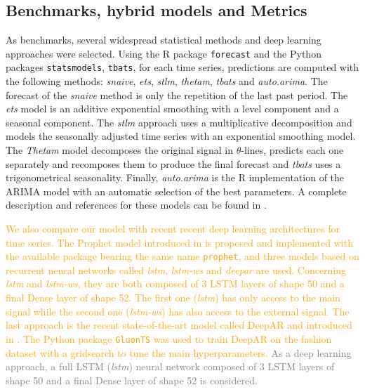 \documentclass[10pt]{article} %
\begin{document}
\subsection{Benchmarks, hybrid models and Metrics}
\label{sec:fashiontraining}

As benchmarks, several widespread statistical methods and deep learning approaches were selected. Using the R package \texttt{forecast} and the Python packages \texttt{statsmodels},  \texttt{tbats}, for each time series, predictions are computed with the following methods: \textit{snaive}, \textit{ets}, \textit{stlm}, \textit{thetam}, \textit{tbats} and \textit{auto.arima}. The forecast of the \textit{snaive} method is only the repetition of the last past period. The \textit{ets} model is an additive exponential smoothing with a level component and a seasonal component. The \textit{stlm} approach uses a multiplicative decomposition and models the seasonally adjusted time series with an exponential smoothing model. The \textit{Thetam} model decomposes the original signal in $\theta$-lines, predicts each one separately and recomposes them to produce the final forecast and \textit{tbats} uses a trigonometrical seasonality. Finally, \textit{auto.arima} is the R implementation of the ARIMA model with an automatic selection of the best parameters. A complete description and references for these models can be found in \citet{hyndman2020}. 

\textcolor{orange}{We also compare our model with recent recent deep learning architectures for time series. The Prophet model introduced in \citet{Taylor2017} is proposed and implemented with the available package bearing the same name \texttt{prophet}, and three models based on recurrent neural networks called \textit{lstm}, \textit{lstm-ws} and \textit{deepar} are used. Concerning \textit{lstm} and \textit{lstm-ws}, they are both composed of 3 LSTM layers of shape 50 and a final Dense layer of shape 52. The first one (\textit{lstm}) has only access to the main signal while the second one (\textit{lstm-ws}) has also access to the external signal. The last approach is the recent state-of-the-art model called DeepAR and introduced in \citet{salinas2020}. The Python package \texttt{GluonTS} \citep{Alexandrov2020} was used to train DeepAR on the fashion dataset with a gridsearch to tune the main hyperparameters.} \textcolor{gray}{As a deep learning approach, a full LSTM (\textit{lstm}) neural network composed of 3 LSTM layers of shape 50 and a final Dense layer of shape 52 is considered.}
\end{document}
